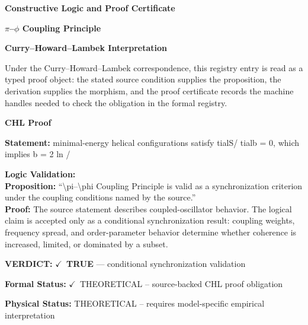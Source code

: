 \clearpage
\begingroup\tzpsupportsetup
\noindent\textbf{\fontsize{10.8pt}{12.8pt}\selectfont [ID 0114] Constructive Logic and Proof Certificate}\par
\noindent\textbf{\fontsize{10pt}{12pt}\selectfont $\pi$--$\phi$ Coupling Principle}\par
\vspace{0.45em}
\begingroup
\footnotesize
\setlength{\parskip}{0.22em}
\setlength{\parindent}{0pt}
\noindent\textbf{Curry--Howard--Lambek Interpretation}\par
Under the Curry--Howard--Lambek correspondence, this registry entry is read as a typed proof
object: the stated source condition supplies the proposition, the derivation supplies the
morphism, and the proof certificate records the machine handles needed to check the obligation
in the formal registry.

\vspace{0.45em}
\noindent\textbf{CHL Proof}\par
\textbf{Statement:} minimal-energy helical configurations satisfy  tialS/ tialb = 0, which implies b = 2
ln /

\textbf{Logic Validation:}\\
\textbf{Proposition:} ``\textbackslash{}pi--\textbackslash{}phi Coupling Principle is valid as a synchronization criterion under the
coupling conditions named by the source.''\\
\textbf{Proof:} The source statement describes coupled-oscillator behavior. The logical claim is
accepted only as a conditional synchronization result: coupling weights, frequency
spread, and order-parameter behavior determine whether coherence is increased, limited,
or dominated by a subset.

\textbf{VERDICT:} \ensuremath{\checkmark}\ \textbf{TRUE} --- conditional synchronization validation

\textbf{Formal Status:} \ensuremath{\checkmark}\ THEORETICAL -- source-backed CHL proof obligation

\textbf{Physical Status:} THEORETICAL -- requires model-specific empirical interpretation
\par\vspace{0.45em}
\par
\ifTZPDarkEdition
{}
\fi
\endgroup
\endgroup
